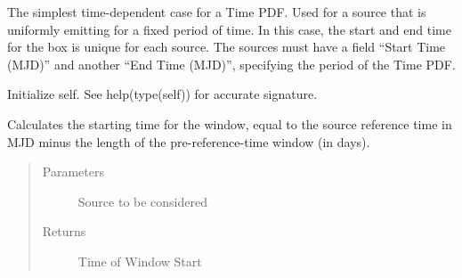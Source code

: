 \documentclass[letterpaper,10pt,english]{sphinxmanual}
\begin{document}
\begin{fulllineitems}
\label{\detokenize{index:flarestack.core.time_pdf.FixedEndBox}}
The simplest time-dependent case for a Time PDF. Used for a source that
is uniformly emitting for a fixed period of time. In this case, the start
and end time for the box is unique for each source. The sources must have
a field “Start Time (MJD)” and another “End Time (MJD)”, specifying the
period of the Time PDF.

\begin{fulllineitems}
\label{\detokenize{index:flarestack.core.time_pdf.FixedEndBox.__init__}}
Initialize self.  See help(type(self)) for accurate signature.

\end{fulllineitems}


\begin{fulllineitems}
\label{\detokenize{index:flarestack.core.time_pdf.FixedEndBox.sig_t0}}
Calculates the starting time for the window, equal to the
source reference time in MJD minus the length of the pre-reference-time
window (in days).
\begin{quote}\begin{description}
\item[{Parameters}] \leavevmode
{} \textendash{} Source to be considered

\item[{Returns}] \leavevmode
Time of Window Start

\end{description}\end{quote}

\end{fulllineitems}



\end{fulllineitems}
\end{document}
